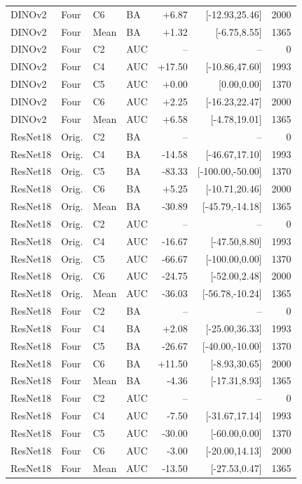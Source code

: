 \begin{longtable}{llllrrr}
DINOv2 & Four & C6 & BA & +6.87 & [-12.93,25.46] & 2000 \\
DINOv2 & Four & Mean & BA & +1.32 & [-6.75,8.55] & 1365 \\
DINOv2 & Four & C2 & AUC & -- & -- & 0 \\
DINOv2 & Four & C4 & AUC & +17.50 & [-10.86,47.60] & 1993 \\
DINOv2 & Four & C5 & AUC & +0.00 & [0.00,0.00] & 1370 \\
DINOv2 & Four & C6 & AUC & +2.25 & [-16.23,22.47] & 2000 \\
DINOv2 & Four & Mean & AUC & +6.58 & [-4.78,19.01] & 1365 \\
ResNet18 & Orig. & C2 & BA & -- & -- & 0 \\
ResNet18 & Orig. & C4 & BA & -14.58 & [-46.67,17.10] & 1993 \\
ResNet18 & Orig. & C5 & BA & -83.33 & [-100.00,-50.00] & 1370 \\
ResNet18 & Orig. & C6 & BA & +5.25 & [-10.71,20.46] & 2000 \\
ResNet18 & Orig. & Mean & BA & -30.89 & [-45.79,-14.18] & 1365 \\
ResNet18 & Orig. & C2 & AUC & -- & -- & 0 \\
ResNet18 & Orig. & C4 & AUC & -16.67 & [-47.50,8.80] & 1993 \\
ResNet18 & Orig. & C5 & AUC & -66.67 & [-100.00,0.00] & 1370 \\
ResNet18 & Orig. & C6 & AUC & -24.75 & [-52.00,2.48] & 2000 \\
ResNet18 & Orig. & Mean & AUC & -36.03 & [-56.78,-10.24] & 1365 \\
ResNet18 & Four & C2 & BA & -- & -- & 0 \\
ResNet18 & Four & C4 & BA & +2.08 & [-25.00,36.33] & 1993 \\
ResNet18 & Four & C5 & BA & -26.67 & [-40.00,-10.00] & 1370 \\
ResNet18 & Four & C6 & BA & +11.50 & [-8.93,30.65] & 2000 \\
ResNet18 & Four & Mean & BA & -4.36 & [-17.31,8.93] & 1365 \\
ResNet18 & Four & C2 & AUC & -- & -- & 0 \\
ResNet18 & Four & C4 & AUC & -7.50 & [-31.67,17.14] & 1993 \\
ResNet18 & Four & C5 & AUC & -30.00 & [-60.00,0.00] & 1370 \\
ResNet18 & Four & C6 & AUC & -3.00 & [-20.00,14.13] & 2000 \\
ResNet18 & Four & Mean & AUC & -13.50 & [-27.53,0.47] & 1365 \\
\bottomrule\end{longtable}\endgroup
